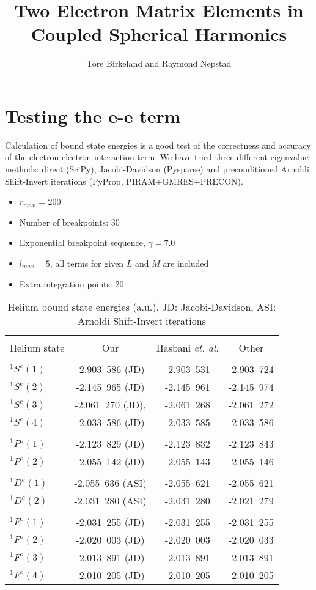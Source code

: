 \documentclass[a4paper,12pt]{paper}
\title{Two Electron Matrix Elements in Coupled Spherical Harmonics}
\author{Tore Birkeland and Raymond Nepstad}
\begin{document}
\section{Testing the e-e term}
Calculation of bound state energies is a good test of the correctness and accuracy of the electron-electron interaction term. We have tried three different eigenvalue methods: direct (SciPy), Jacobi-Davidson (Pysparse) and preconditioned Arnoldi Shift-Invert iterations (PyProp, PIRAM+GMRES+PRECON).

\begin{itemize}
	\item $r_{max}$ = 200
	\item Number of breakpoints: 30
	\item Exponential breakpoint sequence, $\gamma = 7.0$
	\item $l_{max} = 5$, all terms for given $L$ and $M$ are included
	\item Extra integration points: 20
\end{itemize}

\begin{table}
\centering
\begin{tabular}{lccc}
	\hline\\
	Helium state & Our & Hasbani \textit{et. al.} & Other\\
	\hline\\
	$^1S^e(1)$ & -2.903\ 586 (JD) & -2.903\ 531 & -2.903\ 724\\
	$^1S^e(2)$ & -2.145\ 965 (JD) & -2.145\ 961 & -2.145\ 974\\
	$^1S^e(3)$ & -2.061\ 270 (JD), & -2.061\ 268 & -2.061\ 272\\
	$^1S^e(4)$ & -2.033\ 586 (JD) & -2.033\ 585 & -2.033\ 586\\
	\\
	$^1P^o(1)$ & -2.123\ 829 (JD) & -2.123\ 832 & -2.123\ 843\\
	$^1P^o(2)$ & -2.055\ 142 (JD) & -2.055\ 143 & -2.055\ 146\\
	\\
	$^1D^e(1)$ & -2.055\ 636 (ASI) & -2.055\ 621 & -2.055\ 621\\
	$^1D^e(2)$ & -2.031\ 280 (ASI) & -2.031\ 280 & -2.021\ 279\\
	\\
	$^1F^o(1)$ & -2.031\ 255 (JD) & -2.031\ 255 & -2.031\ 255\\
	$^1F^o(2)$ & -2.020\ 003 (JD)& -2.020\ 003 & -2.020\ 033\\
	$^1F^o(3)$ & -2.013\ 891 (JD) & -2.013\ 891 & -2.013\ 891\\
	$^1F^o(4)$ & -2.010\ 205 (JD) & -2.010\ 205 & -2.010\ 205\\
\end{tabular}
\caption{Helium bound state energies (a.u.). JD: Jacobi-Davidson, ASI: Arnoldi Shift-Invert iterations}
\label{tab:}
\end{table}
\end{document}
